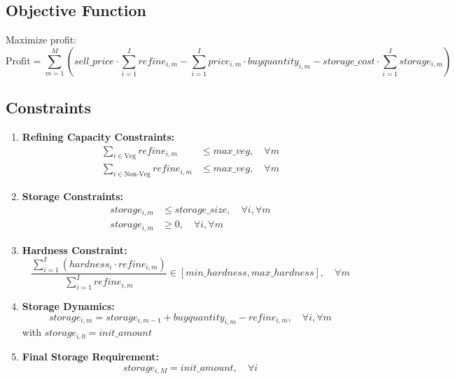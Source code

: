 \documentclass{article}
\begin{document}
\subsection*{Objective Function}
Maximize profit:
\[
\text{Profit} = \sum_{m=1}^{M} \left( sell\_price \cdot \sum_{i=1}^{I} refine_{i,m} - \sum_{i=1}^{I} price_{i,m} \cdot buyquantity_{i,m} - storage\_cost \cdot \sum_{i=1}^{I} storage_{i,m} \right)
\]

\subsection*{Constraints}

\begin{enumerate}
    \item \textbf{Refining Capacity Constraints:}
    \begin{align*}
    \sum_{i \in \text{Veg}} refine_{i,m} & \leq max\_veg, \quad \forall m \\
    \sum_{i \in \text{Non-Veg}} refine_{i,m} & \leq max\_veg, \quad \forall m
    \end{align*}

    \item \textbf{Storage Constraints:}
    \begin{align*}
    storage_{i,m} & \leq storage\_size, \quad \forall i, \forall m \\
    storage_{i,m} & \geq 0, \quad \forall i, \forall m
    \end{align*}

    \item \textbf{Hardness Constraint:}
    \[
    \frac{\sum_{i=1}^{I} (hardness_{i} \cdot refine_{i,m})}{\sum_{i=1}^{I} refine_{i,m}} \in [min\_hardness, max\_hardness], \quad \forall m
    \]

    \item \textbf{Storage Dynamics:}
    \[
    storage_{i,m} = storage_{i,m-1} + buyquantity_{i,m} - refine_{i,m}, \quad \forall i, \forall m
    \]
    with $storage_{i,0} = init\_amount$

    \item \textbf{Final Storage Requirement:}
    \[
    storage_{i,M} = init\_amount, \quad \forall i
    \]
\end{enumerate}
\end{document}
